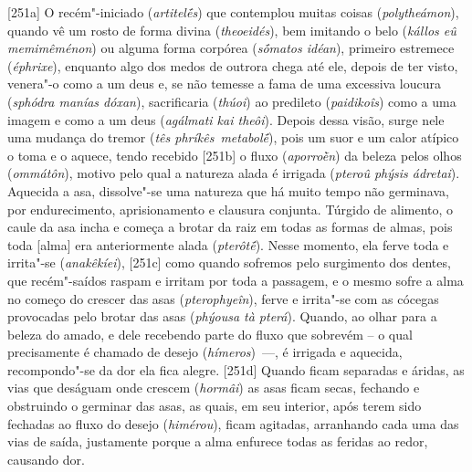 [251a] O recém"-iniciado (\emph{artitelḗs}) que contemplou muitas
coisas (\emph{polytheámon}), quando vê um rosto de forma divina
(\emph{theoeidés}), bem imitando o belo (\emph{kállos eû memimêménon})
ou alguma forma corpórea (\emph{sṓmatos idéan}), primeiro estremece
(\emph{éphrixe}), enquanto algo dos medos de outrora chega até ele,
depois de ter visto, venera"-o como a um deus e, se não temesse a fama de
uma excessiva loucura (\emph{sphódra manías dóxan}), sacrificaria
(\emph{thúoi}) ao predileto (\emph{paidikoîs}) como a uma imagem e como
a um deus (\emph{agálmati kai theôi}). Depois dessa visão, surge nele
uma mudança do tremor (\emph{tês phríkês}~\emph{metabolḗ}), pois um suor
e um calor atípico o toma e o aquece, tendo recebido [251b] o fluxo
(\emph{aporroḕn}) da beleza pelos olhos (\emph{ommátôn}), motivo pelo
qual a natureza alada é irrigada (\emph{pteroû phýsis ádretai}).
Aquecida a asa, dissolve"-se uma natureza que há muito tempo não
germinava, por endurecimento, aprisionamento e clausura conjunta.
Túrgido de alimento, o caule da asa incha e começa a brotar da raiz em
todas as formas de almas, pois toda [alma] era anteriormente alada
(\emph{pterôtḗ}). Nesse momento, ela ferve toda e irrita"-se
(\emph{anakêkíei}), [251c] como quando sofremos pelo surgimento dos
dentes, que recém"-saídos raspam e irritam por toda a passagem, e o mesmo
sofre a alma no começo do crescer das asas (\emph{pterophyeîn}), ferve e
irrita"-se com as cócegas provocadas pelo brotar das asas (\emph{phýousa
tà pterá}). Quando, ao olhar para a beleza do amado, e dele recebendo
parte do fluxo que sobrevém -- o qual precisamente é chamado de desejo
(\emph{hímeros})~\mbox{---,} é irrigada e aquecida, recompondo"-se da dor ela
fica alegre. [251d] Quando ficam separadas e áridas, as vias que
deságuam onde crescem (\emph{hormâi}) as asas ficam secas, fechando e
obstruindo o germinar das asas, as quais, em seu interior, após terem
sido fechadas ao fluxo do desejo (\emph{himérou}), ficam agitadas,
arranhando cada uma das vias de saída, justamente porque a alma enfurece
todas as feridas ao redor, causando dor.


